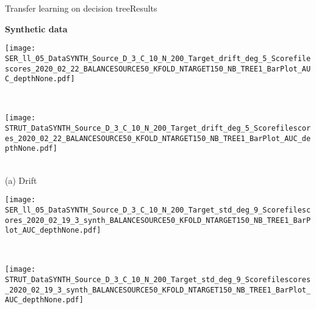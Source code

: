 \begin{frame}{Transfer learning on decision tree}{Results}

\centering
\textbf{Synthetic data}

    \renewcommand{\ratio}{1.0}
        \begin{minipage}[t]{0.33\linewidth}\vspace{0pt}
            \centering
            \begin{minipage}[t]{\ratio\linewidth}\vspace{0pt}
            \centerline{\texttt{[image: SER\_ll\_05\_DataSYNTH\_Source\_D\_3\_C\_10\_N\_200\_Target\_drift\_deg\_5\_Scorefilescores\_2020\_02\_22\_BALANCESOURCE50\_KFOLD\_NTARGET150\_NB\_TREE1\_BarPlot\_AUC\_depthNone.pdf]}}
            \end{minipage}\\
            \begin{minipage}[t]{\ratio\linewidth}\vspace{0cm}
            \centerline{\texttt{[image: STRUT\_DataSYNTH\_Source\_D\_3\_C\_10\_N\_200\_Target\_drift\_deg\_5\_Scorefilescores\_2020\_02\_22\_BALANCESOURCE50\_KFOLD\_NTARGET150\_NB\_TREE1\_BarPlot\_AUC\_depthNone.pdf]}}
            \end{minipage}\\
            \medskip
            {\small(a)\; Drift}
        \end{minipage}
        \begin{minipage}[t]{0.33\linewidth}\vspace{0pt}
            \centering
            \begin{minipage}[t]{\ratio\linewidth}\vspace{0pt}
            \centerline{\texttt{[image: SER\_ll\_05\_DataSYNTH\_Source\_D\_3\_C\_10\_N\_200\_Target\_std\_deg\_9\_Scorefilescores\_2020\_02\_19\_3\_synth\_BALANCESOURCE50\_KFOLD\_NTARGET150\_NB\_TREE1\_BarPlot\_AUC\_depthNone.pdf]}}
            \end{minipage}\\
            \begin{minipage}[t]{\ratio\linewidth}\vspace{0cm}
            \centerline{\texttt{[image: STRUT\_DataSYNTH\_Source\_D\_3\_C\_10\_N\_200\_Target\_std\_deg\_9\_Scorefilescores\_2020\_02\_19\_3\_synth\_BALANCESOURCE50\_KFOLD\_NTARGET150\_NB\_TREE1\_BarPlot\_AUC\_depthNone.pdf]}}
            \end{minipage}\\

\end{minipage}
\end{frame}
